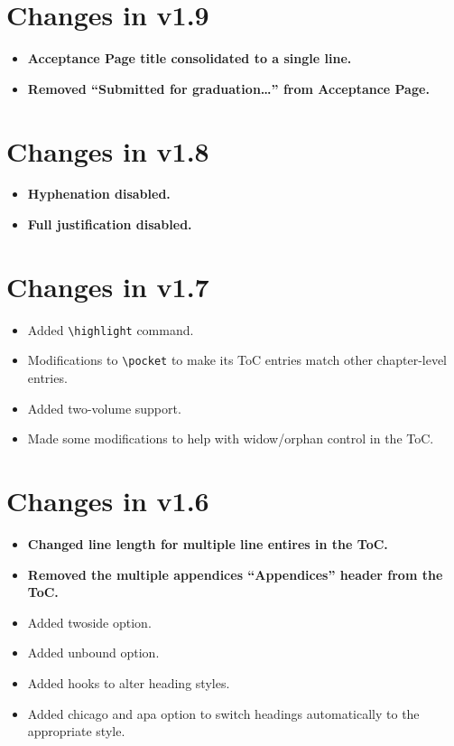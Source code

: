 \section{Changes in v1.9}
\begin{itemize}
\item{\textbf{Acceptance Page title consolidated to a single line.}}
\item{\textbf{Removed ``Submitted for graduation\ldots'' from Acceptance Page.}}
\end{itemize}

\section{Changes in v1.8}
\begin{itemize}
\item{\textbf{Hyphenation disabled.}}
\item{\textbf{Full justification disabled.}}
\end{itemize}

\section{Changes in v1.7}
\begin{itemize}
\item{Added \verb=\highlight= command.}
\item{Modifications to \verb=\pocket= to make its ToC entries match other chapter-level entries.}
\item{Added two-volume support.}
\item{Made some modifications to help with widow/orphan control in the ToC.}
\end{itemize}

\section{Changes in v1.6}
\begin{itemize}
\item{\textbf{Changed line length for multiple line entires in the ToC.}}
\item{\textbf{Removed the multiple appendices ``Appendices'' header from the ToC.}}
\item{Added twoside option.}
\item{Added unbound option.}
\item{Added hooks to alter heading styles.}
\item{Added chicago and apa option to switch headings automatically to the appropriate style.}
\end{itemize}

